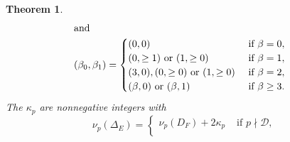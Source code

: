 \documentclass[11pt]{report}
\newtheorem{theorem}{Theorem}[section]
\theoremstyle{definition}
\begin{document}
\begin{theorem}
\begin{align*}
\intertext{and}
(\beta_0, \beta_1) &=
\begin{cases}
(0, 0)
    & \mbox{ if } \beta =0, \\
(0, \geq 1) \mbox{ or } (1, \geq 0)
    & \mbox{ if } \beta =1, \\
(3,0), (0, \geq 0) \mbox{ or } (1, \geq 0)
    & \mbox{ if } \beta =2, \\
(\beta, 0) \mbox{ or } (\beta,1)
    & \mbox{ if } \beta \geq 3.
\end{cases}
\end{align*}
The  $\kappa_p$ are nonnegative integers with
\begin{equation} \label{term0}
\nu_p (\Delta_E)  =
\left\{
\begin{array}{lc}
 \nu_p (D_F) + 2 \kappa_p & \mbox{ if }  p \nmid \mathcal{D}, \\

\end{array}
\end{equation}
\end{theorem}
\end{document}
